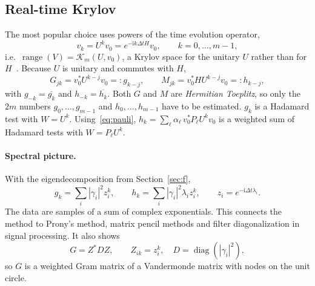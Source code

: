 \documentclass[11pt,a4paper]{article}
\newcommand{\K}{\mathcal{K}}
\begin{document}
\subsection{Real-time Krylov}\label{sec:rt}

The most popular choice uses powers of the time evolution operator,
\begin{equation}
  v_k = U^k v_0 = e^{-\mathrm{i}k\Delta t H}v_0,\qquad k=0,\dots,m-1,
\end{equation}
i.e.\ $\operatorname{range}(V) = \K_m(U,v_0)$, a Krylov space for the
unitary $U$ rather than for $H$~\cite{PM19,Klymko22,CG22,Kirby24}. Because $U$ is unitary and
commutes with $H$,
\begin{equation}
  G_{jk} = v_0^* U^{k-j} v_0 =: g_{k-j},\qquad
  M_{jk} = v_0^* H U^{k-j} v_0 =: h_{k-j},
\end{equation}
with $g_{-k}=\overline{g_k}$ and $h_{-k}=\overline{h_k}$. Both $G$ and $M$ are
\emph{Hermitian Toeplitz}, so only the $2m$ numbers
$g_0,\dots,g_{m-1}$ and $h_0,\dots,h_{m-1}$ have to be estimated.
$g_k$ is a Hadamard test with $W=U^k$. Using~\eqref{eq:pauli},
$h_k = \sum_\ell \alpha_\ell\, v_0^*P_\ell U^k v_0$ is a weighted sum of
Hadamard tests with $W = P_\ell U^k$.

\paragraph{Spectral picture.} With the eigendecomposition from
Section~\ref{sec:f},
\begin{equation}\label{eq:signal}
  g_k = \sum_i |\gamma_i|^2 z_i^k,\qquad h_k = \sum_i |\gamma_i|^2\lambda_i z_i^k,
  \qquad z_i = e^{-\mathrm{i}\Delta t\lambda_i}.
\end{equation}
The data are samples of a sum of complex exponentials. This connects the
method to Prony's method, matrix pencil methods and filter
diagonalization in signal processing. It also shows
\begin{equation}\label{eq:vandermonde}
  G = Z^* D Z,\qquad Z_{ik} = z_i^k,\quad D=\operatorname{diag}(|\gamma_i|^2),
\end{equation}
so $G$ is a weighted Gram matrix of a Vandermonde matrix with nodes on
the unit circle.
\end{document}
